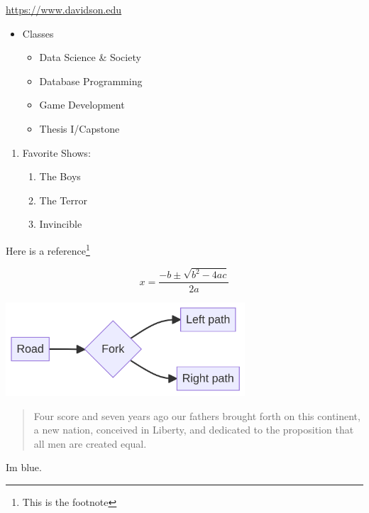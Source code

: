 \documentclass[
  letterpaper,
  DIV=11,
  numbers=noendperiod]{scrartcl}
\providecommand{\tightlist}{%
  \setlength{\itemsep}{0pt}\setlength{\parskip}{0pt}}\usepackage{longtable,booktabs,array}
\begin{document}
\url{https://www.davidson.edu}

\begin{itemize}
\tightlist
\item
  Classes

  \begin{itemize}
  \tightlist
  \item
    Data Science \& Society
  \item
    Database Programming
  \item
    Game Development
  \item
    Thesis I/Capstone
  \end{itemize}
\end{itemize}

\begin{enumerate}
\def\labelenumi{\arabic{enumi}.}
\tightlist
\item
  Favorite Shows:

  \begin{enumerate}
  \def\labelenumii{\arabic{enumii}.}
  \tightlist
  \item
    The Boys\\
  \item
    The Terror\\
  \item
    Invincible
  \end{enumerate}
\end{enumerate}

Here is a reference\footnote{This is the footnote}

\[x = \frac{-b \pm \sqrt{b^2- 4ac}}{2a}\]

\includegraphics[width=3.51in,height=1.38in]{ghc-demo_files/figure-latex/mermaid-figure-1.png}

\begin{quote}
Four score and seven years ago our fathers brought forth on this
continent, a new nation, conceived in Liberty, and dedicated to the
proposition that all men are created equal.
\end{quote}

\begin{tcolorbox}[enhanced jigsaw, left=2mm, colbacktitle=quarto-callout-note-color!10!white, breakable, coltitle=black, toprule=.15mm, leftrule=.75mm, bottomtitle=1mm, opacityback=0, arc=.35mm, title=\textcolor{quarto-callout-note-color}{\faInfo}\hspace{0.5em}{Note}, titlerule=0mm, colback=white, opacitybacktitle=0.6, colframe=quarto-callout-note-color-frame, toptitle=1mm, rightrule=.15mm, bottomrule=.15mm]

Im blue.

\end{tcolorbox}
\end{document}
